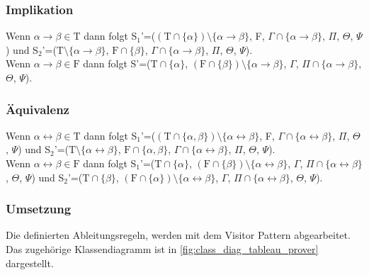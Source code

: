 \subsubsection{Implikation}
Wenn $\alpha\rightarrow\beta\in\textrm{T}$ dann folgt S$_{1}$'=($(\textrm{T}\cap\lbrace\alpha\rbrace)\setminus\lbrace\alpha\rightarrow\beta\rbrace$, F, $\Gamma\cap\lbrace\alpha\rightarrow\beta\rbrace$, $\Pi$, $\Theta$, $\Psi$) und S$_{2}$'=($\textrm{T}\setminus\lbrace\alpha\rightarrow\beta\rbrace$, $\textrm{F}\cap\lbrace\beta\rbrace$, $\Gamma\cap\lbrace\alpha\rightarrow\beta\rbrace$, $\Pi$, $\Theta$, $\Psi$).\\
Wenn $\alpha\rightarrow\beta\in\textrm{F}$ dann folgt S'=($\textrm{T}\cap\lbrace\alpha\rbrace$, $(\textrm{F}\cap\lbrace\beta\rbrace)\setminus\lbrace\alpha\rightarrow\beta\rbrace$, $\Gamma$, $\Pi\cap\lbrace\alpha\rightarrow\beta\rbrace$, $\Theta$, $\Psi$).

\subsubsection{Äquivalenz}
Wenn $\alpha\leftrightarrow\beta\in\textrm{T}$ dann folgt S$_{1}$'=($(\textrm{T}\cap\lbrace\alpha,\beta\rbrace)\setminus\lbrace\alpha\leftrightarrow\beta\rbrace$, F, $\Gamma\cap\lbrace\alpha\leftrightarrow\beta\rbrace$, $\Pi$, $\Theta$, $\Psi$) und S$_{2}$'=($\textrm{T}\setminus\lbrace\alpha\leftrightarrow\beta\rbrace$, $\textrm{F}\cap\lbrace\alpha,\beta\rbrace$, $\Gamma\cap\lbrace\alpha\leftrightarrow\beta\rbrace$, $\Pi$, $\Theta$, $\Psi$).\\
Wenn $\alpha\leftrightarrow\beta\in\textrm{F}$ dann folgt S$_{1}$'=($\textrm{T}\cap\lbrace\alpha\rbrace$, $(\textrm{F}\cap\lbrace\beta\rbrace)\setminus\lbrace\alpha\leftrightarrow\beta\rbrace$, $\Gamma$, $\Pi\cap\lbrace\alpha\leftrightarrow\beta\rbrace$, $\Theta$, $\Psi$) und S$_{2}$'=($\textrm{T}\cap\lbrace\beta\rbrace$, $(\textrm{F}\cap\lbrace\alpha\rbrace)\setminus\lbrace\alpha\leftrightarrow\beta\rbrace$, $\Gamma$, $\Pi\cap\lbrace\alpha\leftrightarrow\beta\rbrace$, $\Theta$, $\Psi$).

\subsubsection{Umsetzung}
Die definierten Ableitungsregeln, werden mit dem Visitor Pattern abgearbeitet. \cite{gof_design_patterns} Das zugehörige Klassendiagramm ist in \autoref{fig:class_diag_tableau_prover} dargestellt.

